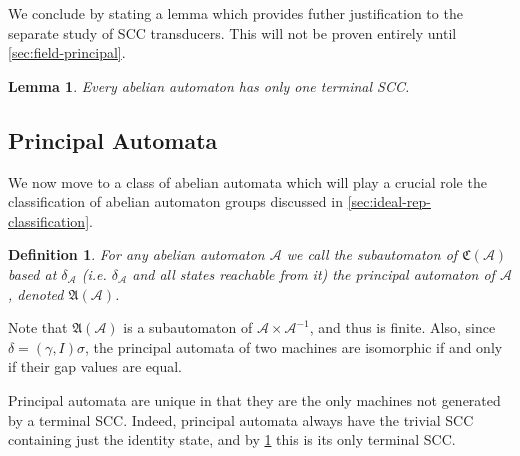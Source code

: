 \documentclass[12pt, letterpaper]{article}
\newcommand{\A}{\mathcal A}
\newcommand{\comp}{\mathfrak C}
\newcommand{\princ}{\mathfrak A}
\newtheorem{lemma}[thm]{Lemma}
\newtheorem{defn}[thm]{Definition}
\begin{document}
We conclude by stating a lemma which provides futher justification to the
separate study of SCC transducers. This will not be proven entirely until
\cref{sec:field-principal}.
\begin{lemma}\label{lemma:one-terminal-scc}
    Every abelian automaton has only one terminal SCC.
\end{lemma}

\subsection{Principal Automata}\label{sec:principal}
We now move to a class of abelian automata which will play a crucial role the
classification of abelian automaton groups discussed in
\cref{sec:ideal-rep-classification}.

\begin{defn}
    For any abelian automaton $\A$ we call the subautomaton of $\comp(\A)$
    based at $\delta_\A$ (i.e. $\delta_\A$ and all states reachable from it)
    the principal automaton of $\A$, denoted $\princ(\A)$.
\end{defn}

Note that $\princ(\A)$ is a subautomaton of $\A \times \A^{-1}$, and thus is
finite. Also, since $\delta = (\gamma, I) \sigma$, the principal automata of
two machines are isomorphic if and only if their gap values are equal.

Principal automata are unique in that they are the only machines not generated
by a terminal SCC.  Indeed, principal automata always have the trivial SCC
containing just the identity state, and by \cref{lemma:one-terminal-scc} this
is its only terminal SCC.
\end{document}
